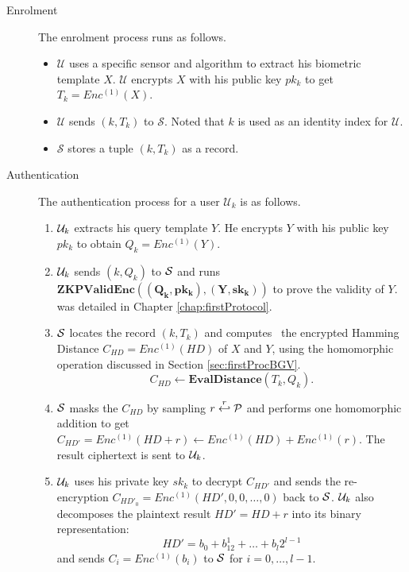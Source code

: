 \begin{description}
\begin{itemize}
	\end{itemize}
	\item[Enrolment] The enrolment process runs as follows.
	\begin{itemize}
		\item $\mathcal{U}$ uses a specific sensor and algorithm to
		extract his biometric template $X$. $\mathcal{U}$
		encrypts $X$ with his public key $pk_k$ to get
		$T_k = Enc^{(1)}(X)$.
		\item $\mathcal{U}$ sends $(k,T_k)$ to $\mathcal{S}$.
		Noted that $k$
		is used as an identity index for $\mathcal{U}$.
		\item $\mathcal{S}$ stores a tuple $(k, T_k)$ as a
		record.
	\end{itemize}
	\item[Authentication] The authentication process for a user
	$\mathcal{U}_k$ is as follows.
	\begin{enumerate}
		\item $\mathcal{U}_k$ extracts his query template $Y$. He
		encrypts $Y$ with his public key $pk_k$ to obtain
		$Q_k = Enc^{(1)}(Y)$.\label{protocol:step1}
              \item $\mathcal{U}_k$ sends $(k,Q_k)$ to $\mathcal{S}$ and runs
                $\mathbf{ZKPValidEnc((Q_k,pk_k),(Y,sk_k))}$ to prove the
                validity of $Y$.\label{protocol:step2} was detailed in Chapter \ref{chap:firstProtocol}.
              \item $\mathcal{S}$ locates the record $(k,T_k)$ and computes \ the
                encrypted Hamming Distance $C_{HD} = Enc^{(1)}( HD)$ of $X$ and
                $Y$, using the homomorphic operation discussed in Section \ref{sec:firstProcBGV}.
		$$C_{HD} \gets
		\textbf{EvalDistance}(T_k,Q_k).$$\label{protocol:step3}
		\item $\mathcal{S}$ masks the $C_{HD}$ by sampling $r
		\stackrel{r}{\hookleftarrow} \mathcal{P}$
		and performs one homomorphic addition to get
		$C_{HD'} = Enc^{(1)}(HD + r) \gets Enc^{(1)}(HD) + Enc^{(1)}(r)$.
		The result ciphertext is sent to $\mathcal{U}_k$.\label{protocol:step4}
		\item $\mathcal{U}_k$ uses his private key $sk_k$ to decrypt $C_{HD'}$
		and sends
		the re-encryption $C_{HD'_0} = Enc^{(1)}(HD',0,0,\dots,0)$ back to $\mathcal{S}$.
		$\mathcal{U}_k$ also decomposes the plaintext result
		$HD' = HD+r$ into its binary representation:
		\[
		HD' = b_0 + b_12^1 + \dots + b_l2^{l-1}
		\]
		and sends $C_i = Enc^{(1)}(b_i)$ to $\mathcal{S}$
		for $i = 0, \dots, l-1$.\label{protocol:step5}


\end{enumerate}
\end{description}
